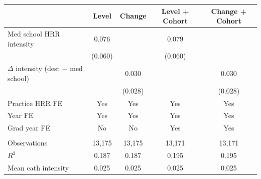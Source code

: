 
\begin{tabular}{lcccc}
\toprule
 & Level & Change & Level + Cohort & Change + Cohort\\
\midrule
Med school HRR intensity & 0.076 &  & 0.079 & \\
 & (0.060) &  & (0.060) & \\
$\Delta$ intensity (dest $-$ med school) &  & 0.030 &  & 0.030\\
 &  & (0.028) &  & (0.028)\\
\addlinespace
Practice HRR FE & Yes & Yes & Yes & Yes\\
Year FE & Yes & Yes & Yes & Yes\\
Grad year FE & No & No & Yes & Yes\\
\midrule\\
Observations & 13,175 & 13,175 & 13,171 & 13,171\\
$R^2$ & 0.187 & 0.187 & 0.195 & 0.195\\
Mean cath intensity & 0.025 & 0.025 & 0.025 & 0.025\\
\bottomrule
\end{tabular}
